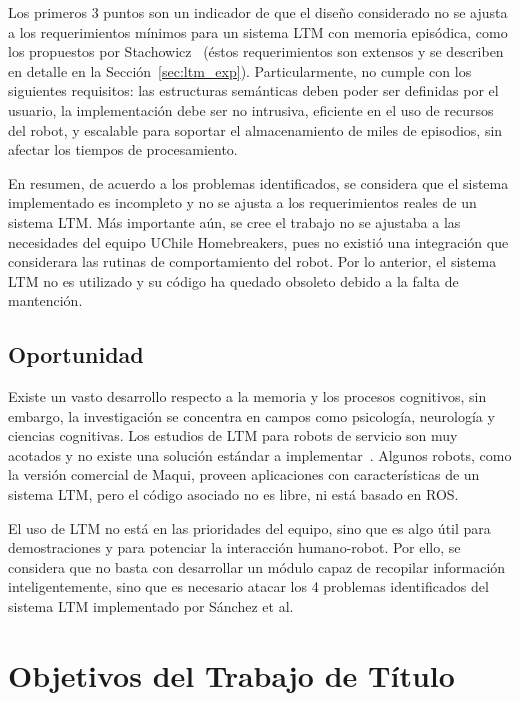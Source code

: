 Los primeros 3 puntos son un indicador de que el diseño considerado no se ajusta a los requerimientos mínimos para un sistema LTM con memoria episódica, como los propuestos por Stachowicz~\cite{Stachowicz2012} (éstos requerimientos son extensos y se describen en detalle en la Sección~\ref{sec:ltm_exp}). Particularmente, no cumple con los siguientes requisitos: las estructuras semánticas deben poder ser definidas por el usuario, la implementación debe ser no intrusiva, eficiente en el uso de recursos del robot, y escalable para soportar el almacenamiento de miles de episodios, sin afectar los tiempos de procesamiento.

En resumen, de acuerdo a los problemas identificados, se considera que el sistema implementado es incompleto y no se ajusta a los requerimientos reales de un sistema LTM. Más importante aún, se cree el trabajo no se ajustaba a las necesidades del equipo UChile Homebreakers, pues no existió una integración que considerara las rutinas de comportamiento del robot. Por lo anterior, el sistema LTM no es utilizado y su código ha quedado obsoleto debido a la falta de mantención.

\subsection{Oportunidad}

Existe un vasto desarrollo respecto a la memoria y los procesos cognitivos, sin embargo, la investigación se concentra en campos como psicología, neurología y ciencias cognitivas. Los estudios de LTM para robots de servicio son muy acotados y no existe una solución estándar a implementar~\cite{ltm_in_robocup}. Algunos robots, como la versión comercial de Maqui, proveen aplicaciones con características de un sistema LTM, pero el código asociado no es libre, ni está basado en ROS.

El uso de LTM no está en las prioridades del equipo, sino que es algo útil para demostraciones y para potenciar la interacción humano-robot. Por ello, se considera que no basta con desarrollar un módulo capaz de recopilar información inteligentemente, sino que es necesario atacar los 4 problemas identificados del sistema LTM implementado por Sánchez et al.


\section{Objetivos del Trabajo de Título}\label{sec:objetivos}

